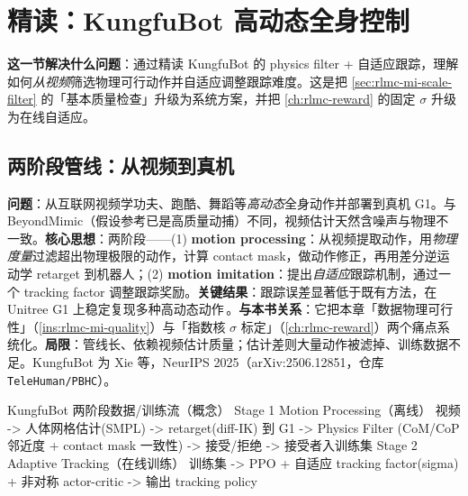 \section{精读：KungfuBot 高动态全身控制}
\label{sec:rlmc-mi-kungfu}

\textbf{这一节解决什么问题}：通过精读 KungfuBot 的 physics filter + 自适应跟踪，理解如何\emph{从视频}筛选物理可行动作并自适应调整跟踪难度。这是把 \cref{sec:rlmc-mi-scale-filter} 的「基本质量检查」升级为系统方案，并把 \cref{ch:rlmc-reward} 的固定 $\sigma$ 升级为在线自适应。

\subsection{两阶段管线：从视频到真机}
\label{sec:rlmc-mi-kungfu-pipeline}

\begin{paper}\label{paper:rlmc-mi-kungfu}
\textbf{问题}：从互联网视频学功夫、跑酷、舞蹈等\emph{高动态}全身动作并部署到真机 G1。与 BeyondMimic（假设参考已是高质量动捕）不同，视频估计天然含噪声与物理不一致。\textbf{核心思想}：两阶段——(1) \textbf{motion processing}：从视频提取动作，用\emph{物理度量}过滤超出物理极限的动作，计算 contact mask，做动作修正，再用差分逆运动学 retarget 到机器人；(2) \textbf{motion imitation}：提出\emph{自适应}跟踪机制，通过一个 tracking factor 调整跟踪奖励。\textbf{关键结果}：跟踪误差显著低于既有方法，在 Unitree G1 上稳定复现多种高动态动作\,\cite{xie2025kungfubot}。\textbf{与本书关系}：它把本章「数据物理可行性」（\cref{ins:rlmc-mi-quality}）与「指数核 $\sigma$ 标定」（\cref{ch:rlmc-reward}）两个痛点系统化。\textbf{局限}：管线长、依赖视频估计质量；估计差则大量动作被滤掉、训练数据不足。KungfuBot 为 Xie 等，NeurIPS 2025（arXiv:2506.12851，仓库 \texttt{TeleHuman/\allowbreak PBHC}）。
\end{paper}

\begin{codebox}[text]{KungfuBot 两阶段数据/训练流（概念）}
Stage 1 Motion Processing（离线）
  视频 -> 人体网格估计(SMPL) -> retarget(diff-IK) 到 G1
      -> Physics Filter (CoM/CoP 邻近度 + contact mask 一致性)
      -> 接受/拒绝 -> 接受者入训练集
Stage 2 Adaptive Tracking（在线训练）
  训练集 -> PPO + 自适应 tracking factor(sigma) + 非对称 actor-critic
      -> 输出 tracking policy
\end{codebox}


